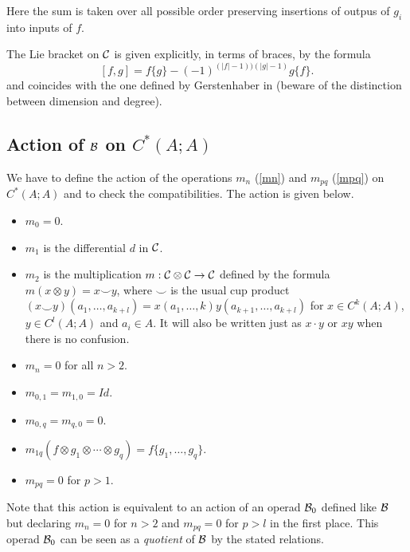 \documentclass[TFM.tex]{subfiles}
\begin{document}
Here the sum is taken over all possible order preserving insertions of outpus of $g_i$ into
inputs of $f$.




The Lie bracket on $\mathcal{C}$ is given explicitly, in terms of braces, by the formula %
\[
[f,g]=f\{g\}-(-1)^{(|f|-1))(|g|-1)}g\{f\}.
\]
and coincides with the one defined by Gerstenhaber in \cite{Gerstenhaber} (beware of the distinction between dimension and degree).




\subsection{Action of $\mathcal{B}$ on $C^*(A;A)$}
We have to define the action of the operations
$m_n$ (\ref{mn}) and $m_{pq}$ (\ref{mpq}) on $C^*(A;A)$ and to check the compatibilities. The action is given below.
\begin{itemize}
\item $m_0=0$.
\item $m_1$ is the differential $d$ in $\mathcal{C}$. 
\item $m_2$ is the multiplication $m:\mathcal{C}\otimes\mathcal{C}\to\mathcal{C}$ defined by the formula $m(x\otimes y)=x\smile y$, where $\smile$ is the usual cup product $(x\smile y)(a_1,\dots, a_{k+l})=x(a_1,\dots, k)y(a_{k+1},\dots, a_{k+l})$ for $x\in C^k(A;A)$, $y\in C^l(A;A)$ and $a_i\in A$. It will also be written just as $x\cdot y$ or $xy$ when there is no confusion.
\item $m_n=0$ for all $n>2$. 
\item $m_{0,1}=m_{1,0}=Id$.
\item $m_{0,q}=m_{q,0}=0$.
\item $m_{1q}(f\otimes g_1\otimes\cdots\otimes g_q)=f\{g_1,\dots, g_q\}$.
\item $m_{pq}=0$ for $p>1$.
\end{itemize}
Note that this action is equivalent to an action of an operad $\mathcal{B}_0$ defined like $\mathcal{B}$ but declaring $m_n=0$ for $n>2$ and $m_{pq}=0$ for $p>l$ in the first place. This operad $\mathcal{B}_0$ can be seen as a \emph{quotient} of $\mathcal{B}$ by the stated relations. 

%
\end{document}
